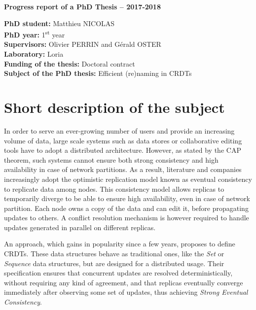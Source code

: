 \documentclass[11pt]{article}
\begin{document}
\bigskip
\centerline{\Large\textbf{Progress report of a PhD Thesis -- 2017-2018}}
\bigskip
\bigskip

\noindent\textbf{PhD student:}
Matthieu NICOLAS
\\

\noindent\textbf{PhD year:}
1\textsuperscript{st} year
\\

\noindent\textbf{Supervisors:}
Olivier PERRIN and Gérald OSTER
\\

\noindent\textbf{Laboratory:}
\ac{Loria}
\\

\noindent\textbf{Funding of the thesis:}
Doctoral contract
\\

\noindent\textbf{Subject of the PhD thesis:}
Efficient (re)naming in \acp{CRDT}
\\


\section*{Short description of the subject}

\hspace{1em} In order to serve an ever-growing number of users and provide an increasing volume of data,
large scale systems such as data stores or collaborative editing tools have to adopt a distributed architecture.
However, as stated by the CAP theorem, such systems cannot ensure both strong consistency and high availability in case of network partitions.
As a result, literature and companies increasingly adopt the optimistic replication model known as eventual consistency to replicate data among nodes.
This consistency model allows replicas to temporarily diverge to be able to ensure high availability, even in case of network partition.
Each node owns a copy of the data and can edit it, before propagating updates to others.
A conflict resolution mechanism is however required to handle updates generated in parallel on different replicas.

An approach, which gains in popularity since a few years, proposes to define \acfp{CRDT}.
These data structures behave as traditional ones, like the \emph{Set} or \emph{Sequence} data structures, but are designed for a distributed usage.
Their specification ensures that concurrent updates are resolved deterministically, without requiring any kind of agreement, and that replicas eventually converge immediately after observing some set of updates,
thus achieving \emph{Strong Eventual Consistency}.
\end{document}
